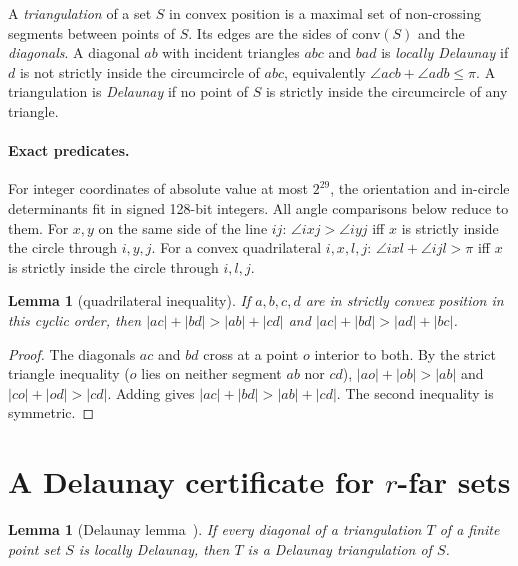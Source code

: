 \documentclass[11pt,a4paper]{article}
\newtheorem{lemma}[theorem]{Lemma}
\theoremstyle{definition}
\newcommand{\ang}{\angle}
\begin{document}
A \emph{triangulation} of a set $S$ in convex position is a maximal set of
non-crossing segments between points of $S$. Its edges are the sides of
$\mathrm{conv}(S)$ and the \emph{diagonals}. A diagonal $ab$ with incident
triangles $abc$ and $bad$ is \emph{locally Delaunay} if $d$ is not strictly
inside the circumcircle of $abc$, equivalently
$\ang acb+\ang adb\le\pi$. A triangulation is \emph{Delaunay} if no point of
$S$ is strictly inside the circumcircle of any triangle.

\paragraph{Exact predicates.} For integer coordinates of absolute value at
most $2^{29}$, the orientation and in-circle determinants fit in signed 128-bit
integers. All angle comparisons below reduce to them. For $x,y$ on the same
side of the line $ij$: $\ang ixj>\ang iyj$ iff $x$ is strictly inside the
circle through $i,y,j$. For a convex quadrilateral $i,x,l,j$:
$\ang ixl+\ang ijl>\pi$ iff $x$ is strictly inside the circle through
$i,l,j$.

\begin{lemma}[quadrilateral inequality]\label{lem:quad}
If $a,b,c,d$ are in strictly convex position in this cyclic order, then
$|ac|+|bd|>|ab|+|cd|$ and $|ac|+|bd|>|ad|+|bc|$.
\end{lemma}
\begin{proof}
The diagonals $ac$ and $bd$ cross at a point $o$ interior to both. By the
strict triangle inequality ($o$ lies on neither segment $ab$ nor $cd$),
$|ao|+|ob|>|ab|$ and $|co|+|od|>|cd|$. Adding gives
$|ac|+|bd|>|ab|+|cd|$. The second inequality is symmetric.
\end{proof}

\section{A Delaunay certificate for \texorpdfstring{$r$}{r}-far sets}

\begin{lemma}[Delaunay lemma~\cite{Del34,Ede01,BCKO08}]\label{lem:delaunay}
If every diagonal of a triangulation $T$ of a finite point set $S$ is locally
Delaunay, then $T$ is a Delaunay triangulation of $S$.
\end{lemma}
\end{document}
